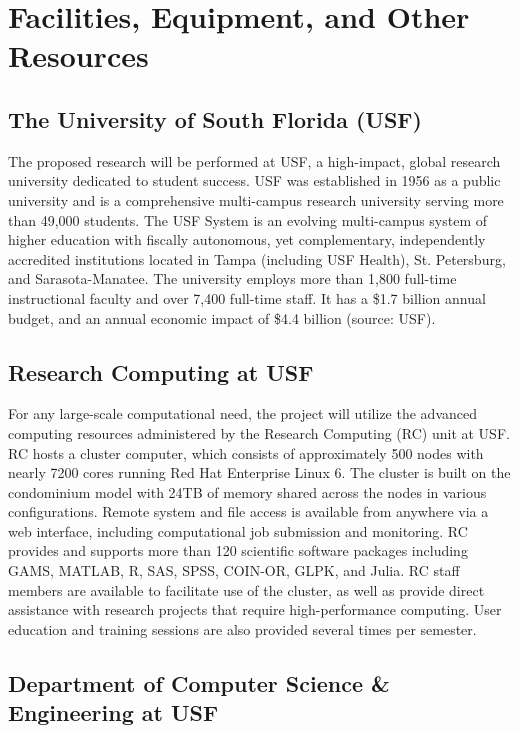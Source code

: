 \section*{Facilities, Equipment, and Other Resources}

\subsection*{The University of South Florida (USF)}

The proposed research will be performed at USF, a high-impact, global research university dedicated to student success. USF was established in 1956 as a public university and is a comprehensive multi-campus research university serving more than 49,000 students. The USF System is an evolving multi-campus system of higher education with fiscally autonomous, yet complementary, independently accredited institutions located in Tampa (including USF Health), St. Petersburg, and Sarasota-Manatee. The university employs more than 1,800 full-time instructional faculty and over 7,400 full-time staff. It has a \$1.7 billion annual budget, and an annual economic impact of \$4.4 billion (source: USF). 

\subsection*{Research Computing at USF}

For any large-scale computational need, the project will utilize the advanced computing resources administered by the Research Computing (RC) unit at USF. RC hosts a cluster computer, which consists of approximately 500 nodes with nearly 7200 cores running Red Hat Enterprise Linux 6. The cluster is built on the condominium model with 24TB of memory shared across the nodes in various configurations. Remote system and file access is available from anywhere via a web interface, including computational job submission and monitoring. RC provides and supports more than 120 scientific software packages including GAMS, MATLAB, R, SAS, SPSS, COIN-OR, GLPK, and Julia. RC staff members are available to facilitate use of the cluster, as well as provide direct assistance with research projects that require high-performance computing. User education and training sessions are also provided several times per semester. 

\subsection*{Department of Computer Science \& Engineering at USF}

